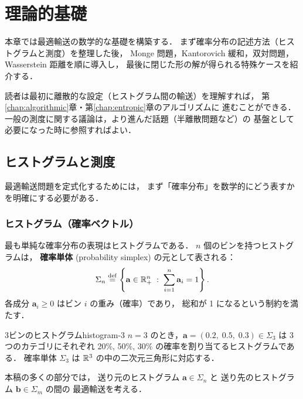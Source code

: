 
\chapter{理論的基礎}\label{chap:theoretical}

本章では最適輸送の数学的な基礎を構築する．
まず確率分布の記述方法（ヒストグラムと測度）を整理した後，
Monge 問題，Kantorovich 緩和，双対問題，Wasserstein 距離を順に導入し，
最後に閉じた形の解が得られる特殊ケースを紹介する．

読者は最初に離散的な設定（ヒストグラム間の輸送）を理解すれば，
第\ref{chap:algorithmic}章・第\ref{chap:entropic}章のアルゴリズムに
進むことができる．
一般の測度に関する議論は，より進んだ話題（半離散問題など）の
基盤として必要になった時に参照すればよい．


\section{ヒストグラムと測度}\label{sec:histograms}

最適輸送問題を定式化するためには，
まず「確率分布」を数学的にどう表すかを明確にする必要がある．

\subsection{ヒストグラム（確率ベクトル）}\label{subsec:histogram}

最も単純な確率分布の表現はヒストグラムである．
$n$ 個のビンを持つヒストグラムは，
\textbf{確率単体} (probability simplex) の元として表される：
\begin{equation}\label{eq:simplex}
  \Sigma_n \overset{\mathrm{def}}{=}
  \left\{
    \mathbf{a} \in \mathbb{R}^n_+ \;:\; \sum_{i=1}^{n} \mathbf{a}_i = 1
  \right\}.
\end{equation}
各成分 $\mathbf{a}_i \geq 0$ はビン $i$ の重み（確率）であり，
総和が 1 になるという制約を満たす．

\begin{example}{3ビンのヒストグラム}{histogram-3}
$n=3$ のとき，$\mathbf{a} = (0.2,\; 0.5,\; 0.3) \in \Sigma_3$ は
3つのカテゴリにそれぞれ 20\%, 50\%, 30\% の確率を割り当てるヒストグラムである．
確率単体 $\Sigma_3$ は $\mathbb{R}^3$ の中の二次元三角形に対応する．
\end{example}

本稿の多くの部分では，
送り元のヒストグラム $\mathbf{a} \in \Sigma_n$ と
送り先のヒストグラム $\mathbf{b} \in \Sigma_m$ の間の
最適輸送を考える．

